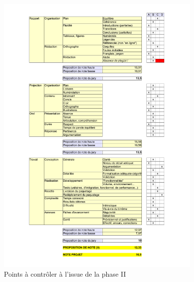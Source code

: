 \documentclass[11pt, french, screen]{report-rd-info}
\begin{document}
\begin{figure}
         \includegraphics[width=0.9\textwidth]{Images/Grille-Evaluation-PRD2}
      \fi
	\caption{Points à contrôler à l'issue de la phase II}
	\label{fig:AutoEvaluationTravailFinal}
\end{figure}
\end{document}
